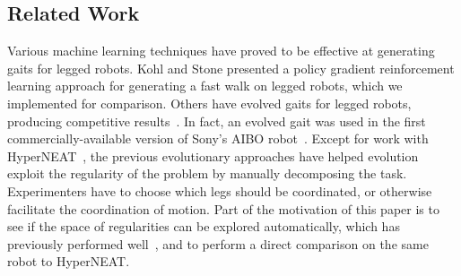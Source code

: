 \subsection{Related Work}

Various machine learning techniques have proved to be effective at
generating gaits for legged robots. Kohl and Stone presented a policy
gradient reinforcement learning approach for generating a fast walk on
legged robots\citep{kohl}, which we implemented for comparison. Others
have evolved gaits for legged robots, producing competitive
results~\citep{chernova2005evolutionary, hornby2005autonomous, zykov,
  clune2009evolving, clune2011performance, clune2009hybrid,
  clune2009sensitivity, tellez2006evolving, valsalam2008modular}. In
fact, an evolved gait was used in the first commercially-available
version of Sony's AIBO robot~\citep{hornby2005autonomous}. Except for
work with HyperNEAT~\citep{clune2009evolving, clune2011performance,
  clune2009hybrid, clune2009sensitivity}, the previous evolutionary
approaches have helped evolution exploit the regularity of the problem
by manually decomposing the task. Experimenters have
to choose which legs should be coordinated, or otherwise facilitate
the coordination of motion. Part of the motivation of this paper
is to see if the space of regularities can be explored automatically,
which has previously performed well~\citep{valsalam2008modular}, and to
perform a direct comparison on the same robot to HyperNEAT.


